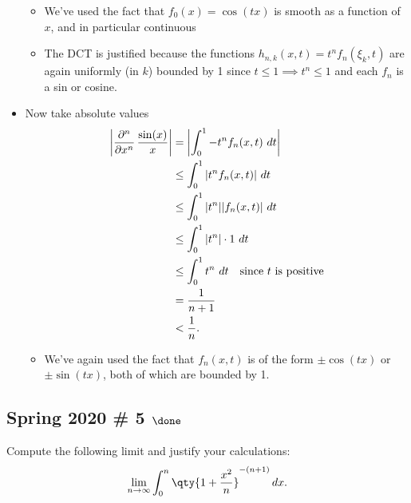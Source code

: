 \begin{solution}
\begin{itemize}
  \begin{itemize}
  \tightlist
  \item
    We've used the fact that \(f_0(x) = \cos(tx)\) is smooth as a
    function of \(x\), and in particular continuous
  \item
    The DCT is justified because the functions
    \(h_{n, k}(x, t) = t^n f_n(\xi_k, t)\) are again uniformly (in
    \(k\)) bounded by 1 since \(t\leq 1 \implies t^n \leq 1\) and each
    \(f_n\) is a sin or cosine.
  \end{itemize}
\item
  Now take absolute values
  \begin{align*}
  {\left\lvert {{\frac{\partial ^n}{\partial x^n}\,} {\sin(x) \over x}  } \right\rvert}
  &= {\left\lvert { \int_0^1 -t^n f_n(x, t) ~dt } \right\rvert} \\ 
  &\leq \int_0^1 {\left\lvert {t^n f_n(x, t)} \right\rvert} ~dt \\
  &\leq \int_0^1 {\left\lvert {t^n} \right\rvert} {\left\lvert {f_n(x, t)} \right\rvert} ~dt \\
  &\leq \int_0^1 {\left\lvert { t^n} \right\rvert} \cdot 1 ~dt \\ 
  &\leq \int_0^1 t^n ~dt \quad\text{since $t$ is positive} \\ 
  &= \frac{1}{n+1} \\
  &< \frac{1}{n}
  .\end{align*}

  \begin{itemize}
  \tightlist
  \item
    We've again used the fact that \(f_n(x, t)\) is of the form
    \(\pm \cos(tx)\) or \(\pm \sin(tx)\), both of which are bounded by
    1.
  \end{itemize}
\end{itemize}

\end{solution}

\hypertarget{spring-2020-5-done}{%
\subsection{\texorpdfstring{Spring 2020 \# 5
\(\done\)}{Spring 2020 \# 5 \textbackslash done}}\label{spring-2020-5-done}}

Compute the following limit and justify your calculations:
\begin{align*}
\lim_{n\to\infty} \int_0^n \qty{1 + {x^2 \over n}}^{-(n+1)} \,dx
.\end{align*}

